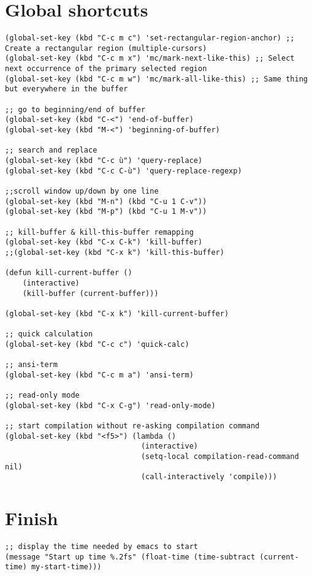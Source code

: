 \documentclass[11pt]{article}
\begin{document}
\section{Global shortcuts}
\label{sec-4}
\begin{verbatim}
(global-set-key (kbd "C-c m c") 'set-rectangular-region-anchor) ;; Create a rectangular region (multiple-cursors)
(global-set-key (kbd "C-c m x") 'mc/mark-next-like-this) ;; Select next occurrence of the primary selected region
(global-set-key (kbd "C-c m w") 'mc/mark-all-like-this) ;; Same thing but everywhere in the buffer

;; go to beginning/end of buffer
(global-set-key (kbd "C-<") 'end-of-buffer)
(global-set-key (kbd "M-<") 'beginning-of-buffer)

;; search and replace
(global-set-key (kbd "C-c ù") 'query-replace)
(global-set-key (kbd "C-c C-ù") 'query-replace-regexp)

;;scroll window up/down by one line
(global-set-key (kbd "M-n") (kbd "C-u 1 C-v"))
(global-set-key (kbd "M-p") (kbd "C-u 1 M-v"))

;; kill-buffer & kill-this-buffer remapping
(global-set-key (kbd "C-x C-k") 'kill-buffer)
;;(global-set-key (kbd "C-x k") 'kill-this-buffer)

(defun kill-current-buffer ()
    (interactive)
    (kill-buffer (current-buffer)))

(global-set-key (kbd "C-x k") 'kill-current-buffer)

;; quick calculation
(global-set-key (kbd "C-c c") 'quick-calc)

;; ansi-term
(global-set-key (kbd "C-c m a") 'ansi-term)

;; read-only mode
(global-set-key (kbd "C-x C-g") 'read-only-mode)

;; start compilation without re-asking compilation command
(global-set-key (kbd "<f5>") (lambda ()
                               (interactive)
                               (setq-local compilation-read-command nil)
                               (call-interactively 'compile)))
\end{verbatim}
\section{Finish}
\label{sec-5}
\begin{verbatim}
;; display the time needed by emacs to start
(message "Start up time %.2fs" (float-time (time-subtract (current-time) my-start-time)))
\end{verbatim}
\end{document}

